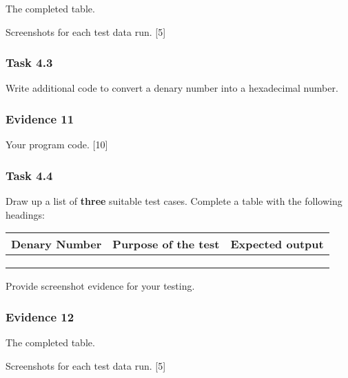 The completed table. 

Screenshots for each test data run. \hfill{}{[}5{]} 

\subsubsection*{Task 4.3}

Write additional code to convert a denary number into a hexadecimal
number. 

\subsubsection*{Evidence 11}

Your program code. \hfill{}{[}10{]}

\subsubsection*{Task 4.4}

Draw up a list of\textbf{ three} suitable test cases. Complete a table
with the following headings:
\begin{center}
\begin{tabular}{|l|l|l|}
\hline 
Denary Number & Purpose of the test & Expected output\tabularnewline
\hline 
 &  & \tabularnewline
\hline 
 &  & \tabularnewline
\hline 
 &  & \tabularnewline
\hline 
\end{tabular}
\par\end{center}

Provide screenshot evidence for your testing.

\subsubsection*{Evidence 12}

The completed table.

Screenshots for each test data run. \hfill{}{[}5{]}